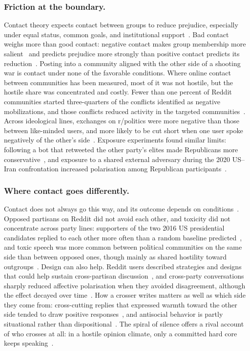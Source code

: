 \subsubsection{Friction at the boundary.}
Contact theory expects contact between groups to reduce prejudice, especially under equal status, common goals, and institutional support~\cite{pettigrew2006contact}. Bad contact weighs more than good contact: negative contact makes group membership more salient~\cite{paolini2010negative} and predicts prejudice more strongly than positive contact predicts its reduction~\cite{barlow2012contact}. Posting into a community aligned with the other side of a shooting war is contact under none of the favorable conditions. Where online contact between communities has been measured, most of it was not hostile, but the hostile share was concentrated and costly. Fewer than one percent of Reddit communities started three-quarters of the conflicts identified as negative mobilizations, and those conflicts reduced activity in the targeted communities~\cite{kumar2018conflict}. Across ideological lines, exchanges on r/politics were more negative than those between like-minded users, and more likely to be cut short when one user spoke negatively of the other's side~\cite{marchal2022benice}. Exposure experiments found similar limits: following a bot that retweeted the other party's elites made Republicans more conservative~\cite{bail2018exposure}, and exposure to a shared external adversary during the 2020 US--Iran confrontation increased polarisation among Republican participants~\cite{jahani2022commonenemy}.


\subsubsection{Where contact goes differently.}
Contact does not always go this way, and its outcome depends on conditions~\cite{xia2025integrated}. Opposed partisans on Reddit did not avoid each other, and toxicity did not concentrate across party lines: supporters of the two 2016 US presidential candidates replied to each other more often than a random baseline predicted~\cite{defrancisci2021noecho}, and toxic speech was more common between political communities on the same side than between opposed ones, though mainly as shared hostility toward outgroups~\cite{efstratiou2023nonpolar}. Design can also help. Reddit users described strategies and designs that could help sustain cross-partisan discussion~\cite{rajadesingan2021crosspartisan}, and cross-party conversations sharply reduced affective polarisation when they avoided disagreement, although the effect decayed over time~\cite{santoro2022crosspartisan}. How a crosser writes matters as well as which side they come from: cross-cutting replies that expressed warmth toward the other side tended to draw positive responses~\cite{marchal2022benice}, and antisocial behavior is partly situational rather than dispositional~\cite{cheng2017troll}. The spiral of silence offers a rival account of who crosses at all: in a hostile opinion climate, only a committed hard core keeps speaking~\cite{noelleneumann1974spiral}.

